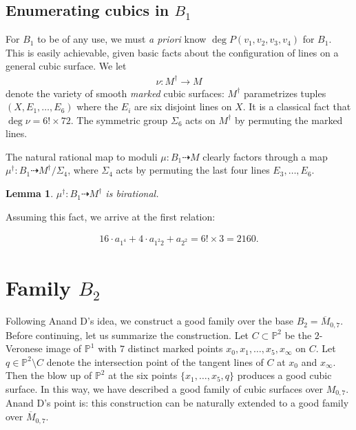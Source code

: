 \documentclass[12 pt]{amsart}
\newtheorem{lemma}{Lemma}[section]
\renewcommand{\P}{\mathbb{P}}
\newcommand{\<}{\left\langle}
\renewcommand{\>}{\right\rangle}
\newcommand{\M}{\overline{M}_{0,7}}
\begin{document}
\subsection{Enumerating cubics in $B_1$}
\label{sec:enum-cubics-b_1}


For $B_1$ to be of any use, we must {\sl a priori} know
$\deg P(v_{1},v_{2},v_{3},v_{4})$ for $B_1$. This is easily
achievable, given basic facts about the configuration of lines on a
general cubic surface. We let
\begin{align}
  \label{eq:nu}
  \nu: M^{\dagger} \to M
  \end{align}
  denote the variety of smooth {\sl marked} cubic surfaces:
  $M^{\dagger}$ parametrizes tuples $(X, E_{1}, \dots, E_{6})$ where
  the $E_{i}$ are six disjoint lines on $X$. It is a classical fact
  that $\deg \nu = 6! \times 72$. The symmetric group $\Sigma_6$ acts
  on $M^{\dagger}$ by permuting the marked lines.

  The natural rational map to moduli $\mu : B_1 \dashrightarrow M$
  clearly factors through a map
  $\mu^{\dagger}: B_1 \dashrightarrow M^{\dagger}/\Sigma_{4}$, where
  $\Sigma_{4}$ acts by permuting the last four lines
  $E_{3}, \dots, E_{6}$.

  \begin{lemma}
    \label{lemma:degreemudaggerB1}
    $\mu^{\dagger}: B_1 \dashrightarrow M^{\dagger}$ is birational.
  \end{lemma}

Assuming this fact, we arrive at the first relation:

\begin{align}
  \label{eq:relation1}
  16 \cdot a_{1^4} + 4 \cdot a_{1^2 2} + a_{2^2} = 6! \times 3 = 2160.
\end{align}

\section{Family $B_2$}
\label{sec:family-b_2}


Following Anand D's idea, we construct a good family over the base
$B_2 = \overline{M}_{0,7}$. Before continuing, let us summarize the
construction. Let $C \subset \P^{2}$ be the $2$-Veronese image of
$\P^{1}$ with $7$ distinct marked points
$x_{0}, x_{1}, \dots, x_{5}, x_{\infty}$ on $C$. Let
$q \in \P^{2} \setminus C$ denote the intersection point of the
tangent lines of $C$ at $x_{0}$ and $x_{\infty}$.  Then the blow up of
$\P^{2}$ at the six points $\{x_{1}, \dots, x_{5}, q\}$ produces a
good cubic surface.  In this way, we have described a good family of
cubic surfaces over $M_{0,7}$.  Anand D's point is: this construction
can be naturally extended to a good family over $\M$.
\end{document}
